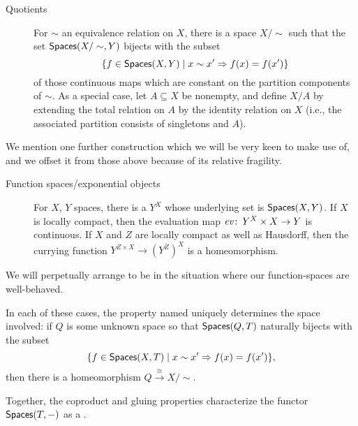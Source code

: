 \begin{description}
    \item[Quotients]
    For $\sim$ an equivalence relation on $X$, there is a space $X / \sim$ such that the set $\mathsf{Spaces}(X / \sim, Y)$ bijects with the subset \[\{f \in \mathsf{Spaces}(X, Y) \mid x \sim x' \Rightarrow f(x) = f(x')\}\] of those continuous maps which are constant on the partition components of $\sim$.
    As a special case, let $A \subseteq X$ be nonempty, and define $X/A$ by extending the total relation on $A$ by the identity relation on $X$ (i.e., the associated partition consists of singletons and $A$).
\end{description}

We mention one further construction which we will be very keen to make use of, and we offset it from those above because of its relative fragility.

\begin{description}
    \item[Function spaces/exponential objects]
    For $X$, $Y$ spaces, there is a  $Y^X$ whose underlying set is $\mathsf{Spaces}(X, Y)$.
    If $X$ is locally compact, then the evaluation map $\mathit{ev}\colon\thinspace Y^X \times X \to Y$ is continuous.
    If $X$ and $Z$ are locally compact as well as Hausdorff, then the currying function $Y^{Z \times X} \to (Y^Z)^X$ is a homeomorphism.
\end{description}

\noindent
We will perpetually arrange to be in the situation where our function-spaces are well-behaved.

\begin{remark}
In each of these cases, the property named uniquely determines the space involved: if $Q$ is some unknown space so that $\mathsf{Spaces}(Q, T)$ naturally bijects with the subset \[\{f \in \mathsf{Spaces}(X, T) \mid x \sim x' \Rightarrow f(x) = f(x') \},\] then there is a homeomorphism $Q \xrightarrow\cong X/\sim$.
\end{remark}

\begin{remark}\label{HomSheafRemark}
Together, the coproduct and gluing properties characterize the functor $\mathsf{Spaces}(T, -)$ as a .
\end{remark}

